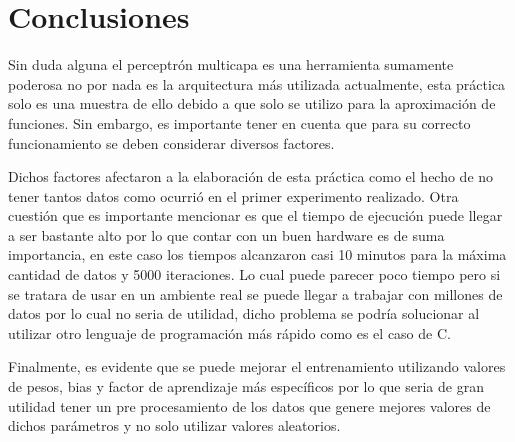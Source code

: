 \section{Conclusiones}
Sin duda alguna el perceptrón multicapa es una herramienta sumamente poderosa no por nada es la arquitectura más utilizada actualmente, esta práctica solo es una muestra de ello debido a que solo se utilizo para la aproximación de funciones. Sin embargo, es importante tener en cuenta que para su correcto funcionamiento se deben considerar diversos factores.

Dichos factores afectaron a la elaboración de esta práctica como el hecho de no tener tantos datos como ocurrió en el primer experimento realizado. Otra cuestión que es importante mencionar es que el tiempo de ejecución puede llegar a ser bastante alto por lo que contar con un buen hardware es de suma importancia, en este caso los tiempos alcanzaron casi 10 minutos para la máxima cantidad de datos y 5000 iteraciones. Lo cual puede parecer poco tiempo pero si se tratara de usar en un ambiente real se puede llegar a trabajar con millones de datos por lo cual no seria de utilidad, dicho problema se podría solucionar al utilizar otro lenguaje de programación más rápido como es el caso de C.

Finalmente, es evidente que se puede mejorar el entrenamiento utilizando valores de pesos, bias y factor de aprendizaje más específicos por lo que seria de gran utilidad tener un pre procesamiento de los datos que genere mejores valores de dichos parámetros y no solo utilizar valores aleatorios.